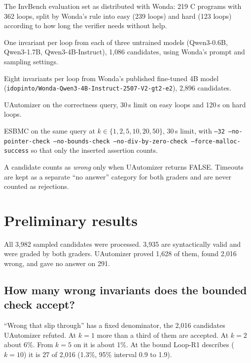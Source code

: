 \documentclass[11pt]{article}
\newcommand{\code}[1]{\texttt{#1}}
\begin{document}
\begin{description}[leftmargin=1.2em]
\item[Programs.] The InvBench evaluation set as distributed with Wonda: 219 C programs with 362
loops, split by Wonda's rule into easy (239 loops) and hard (123 loops) according to how long
the verifier needs without help.
\item[Candidates, batch 1.] One invariant per loop from each of three untrained models
(Qwen3-0.6B, Qwen3-1.7B, Qwen3-4B-Instruct), 1{,}086 candidates, using Wonda's prompt and
sampling settings.
\item[Candidates, batch 2.] Eight invariants per loop from Wonda's published fine-tuned
4B model (\code{idopinto/Wonda-Qwen3-4B-Instruct-2507-V2-gt2-e2}), 2{,}896 candidates.
\item[Full grader.] UAutomizer on the correctness query, 30\,s limit on easy loops and 120\,s on
hard loops.
\item[Cheap grader.] ESBMC on the same query at $k \in \{1,2,5,10,20,50\}$, 30\,s limit, with
\code{--32 --no-pointer-check --no-bounds-check --no-div-by-zero-check --force-malloc-success}
so that only the inserted assertion counts.
\end{description}

A candidate counts as \emph{wrong} only when UAutomizer returns FALSE. Timeouts are kept as a
separate ``no answer'' category for both graders and are never counted as rejections.

\section{Preliminary results}
\label{sec:results}


All 3{,}982 sampled candidates were processed. 3{,}935 are syntactically valid and were graded
by both graders. UAutomizer proved 1{,}628 of them, found 2{,}016 wrong, and gave no answer on 291.

\subsection{How many wrong invariants does the bounded check accept?}

\begin{center}

\end{center}

\noindent ``Wrong that slip through'' has a fixed denominator, the 2{,}016 candidates UAutomizer
refuted. At $k=1$ more than a third of them are accepted. At $k=2$ about 6\%. From $k=5$ on it
is about 1\%. At the bound Loop-R1 describes ($k=10$) it is 27 of 2{,}016 (1.3\%, 95\% interval
0.9 to 1.9).
\end{document}
